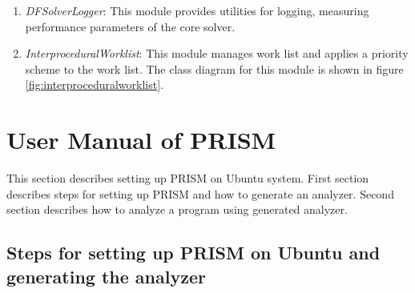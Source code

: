 \documentclass[11pt,a4paper,openright]{report}
\begin{document}
\begin{enumerate}
\item \emph{DFSolverLogger}: This module provides utilities for logging, measuring performance parameters of the core solver.
\item \emph{InterproceduralWorklist}: This module manages work list and applies a priority scheme to the work list. The class diagram for this module is 
shown in figure \ref{fig:interproceduralworklist}.


\end{enumerate}



\chapter{User Manual of PRISM} \label{ap:A}
This section describes setting up PRISM on Ubuntu system. First section describes steps for setting up PRISM and how to generate an analyzer.
Second section describes how to analyze a program using generated analyzer.

\section{Steps for setting up PRISM on Ubuntu and generating the analyzer}
\end{document}
